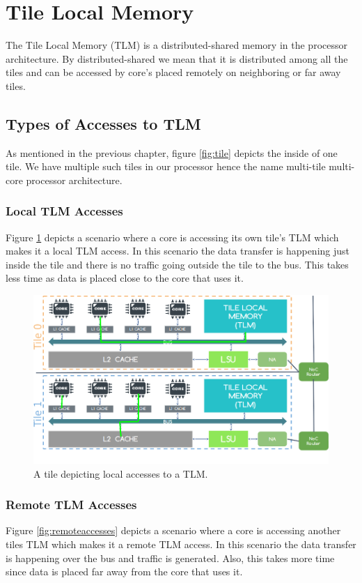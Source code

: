 \documentclass{listhesis}
\begin{document}
\section{Tile Local Memory}
The Tile Local Memory (TLM) is a distributed-shared memory in the processor architecture. By distributed-shared we mean that it is distributed among all the tiles and can be accessed by core's placed remotely on neighboring or far away tiles. 
\subsection{Types of Accesses to TLM}
As mentioned in the previous chapter, figure \ref{fig:tile} depicts the inside of one tile. We have multiple such tiles in our processor hence the name multi-tile multi-core processor architecture.
\subsubsection{Local TLM Accesses}
Figure \ref{fig:localaccesses} depicts a scenario where a core is accessing its own tile's TLM which makes it a local TLM access. In this scenario the data transfer is happening just inside the tile and there is no traffic going outside the tile to the bus. This takes less time as data is placed close to the core that uses it. 

\begin{figure}
  \includegraphics[width=\linewidth]{localaccesses.png}
  \centering
  \caption{A tile depicting local accesses to a TLM.}
  \label{fig:localaccesses}
\end{figure}
\subsubsection{Remote TLM Accesses}
Figure \ref{fig:remoteaccesses} depicts a scenario where a core is accessing another tiles TLM which makes it a remote TLM access. In this scenario the data transfer is happening over the bus and traffic is generated. Also, this takes more time since data is placed far away from the core that uses it. 
\end{document}
